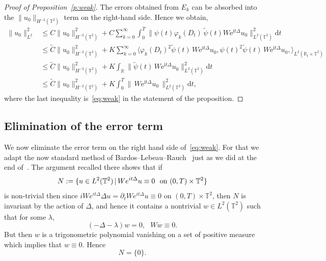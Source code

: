 \documentclass[AHL, Unicode, longabstracts]{cedram}
\newcommand{\R}{{\mathbb R}}
\newcommand{\TT}{{\mathbb T}}
\newcommand{\TT}{{\mathbb T}}
\newcommand{\R}{{\mathbb R}}
\newcommand*{\dd}{\mathrm{d}}
\newcommand*{\dt}{\dd t}
\newcommand*{\tq}{\,|\,}
\begin{document}
\begin{proof}[Proof of Proposition~\ref{p:weak}]
The errors obtained from $ E_k $ can be absorbed into the $
\| u_0 \|_{ H^{-2} (\TT^2) } $ term on the right-hand side. Hence we obtain,
\begin{align*}
\|u_0 \|^2_{L^2} &\leq C \|u_0 \|_{H^{-2} (\TT^2)} ^2+ C \sum_{k=0}^\infty \int_{0}^T
\| \psi (t) \varphi_{k}(D_t)\, \widetilde \psi (t) W \mathrm{e}^{ \mathrm{i}t \Delta }u_0 \|^2_{L^2(\TT^2)} \dt\\
& \leq\widetilde C \|u_0 \|_{H^{-2} (\TT^2)} ^2+ K \sum_{k=0}^\infty
\langle \varphi_{k}(D_t)^2 \widetilde \psi (t) \, W \mathrm{e}^{\mathrm{i}t \Delta }u_0, \psi(t)^2 \widetilde \psi(t)\, W \mathrm{e}^{\mathrm{i}t \Delta}u_0, \rangle_{L^2 (\R_t \times \TT^2)} \\
& \leq \widetilde C \|u_0 \|_{H^{-2} (\TT^2)} ^2 + K \int_\R \| \widetilde \psi (t) \, W \mathrm{e}^{\mathrm{i}t \Delta} u_0\|^2_{L^2(\TT^2)} \dt \\
& \leq \widetilde C \|u_0 \|_{H^{-2} (\TT^2)} ^2 + K \int_{0}^T \|\, W\mathrm{e}^{\mathrm{i}t \Delta } u_0\, \|^2_{L^2(\TT^2)} \dt,
\end{align*}
where the last inequality is~\eqref{eq:weak} in the statement of the proposition.
\end{proof}

\subsection{Elimination of the error term}\label{eli}

We now eliminate the error term on the right hand side of~\eqref{eq:weak}. For that we adapt the now standard method of Bardos--Lebeau--Rauch~\cite{BLR} just as we did at the end of~\cite[Section~4]{BZ4}. The argument recalled there shows that if
\begin{equation}\label{eq:defN0}
N := \{ u \in L^2 (\TT^2) \tq W e^{ i t \Delta } u \equiv 0
\ \text{ on $ (0, T) \times \TT^2 $}\}
\end{equation}
is non-trivial then since $ iW e^{it\Delta } \Delta u= \partial_t W e^{ i t \Delta } u \equiv 0$ on $ (0, T) \times \TT^2 $, then $N$ is invariant by the action of $\Delta$, and hence it contains a nontrivial $ w \in L^2 (\TT^2) $ such that for some $ \lambda $,
\[
(- \Delta - \lambda) w = 0, \ \ \ W w \equiv 0.
\]
But then $ w $ is a trigonometric polynomial vanishing on a set of positive measure which implies that $ w \equiv 0 $. Hence
\begin{equation}\label{eq:N0}
N = \{ 0 \}.
\end{equation}
\end{document}
